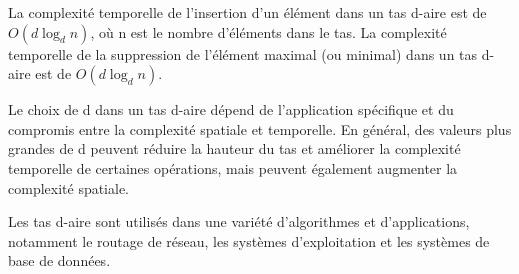 \documentclass{article}
\begin{document}
                La complexité temporelle de l'insertion d'un élément dans un tas d-aire est de $O(d \log_{d} n)$, où n est le nombre d'éléments dans le tas. La complexité temporelle de la suppression de l'élément maximal (ou minimal) dans un tas d-aire est de $O(d \log_{d} n)$.

                Le choix de d dans un tas d-aire dépend de l'application spécifique et du compromis entre la complexité spatiale et temporelle. En général, des valeurs plus grandes de d peuvent réduire la hauteur du tas et améliorer la complexité temporelle de certaines opérations, mais peuvent également augmenter la complexité spatiale.

                Les tas d-aire sont utilisés dans une variété d'algorithmes et d'applications, notamment le routage de réseau, les systèmes d'exploitation et les systèmes de base de données.
            \\ 
            \\
            \begin{center}
            \end{center}


                \newpage
                
\end{document}
